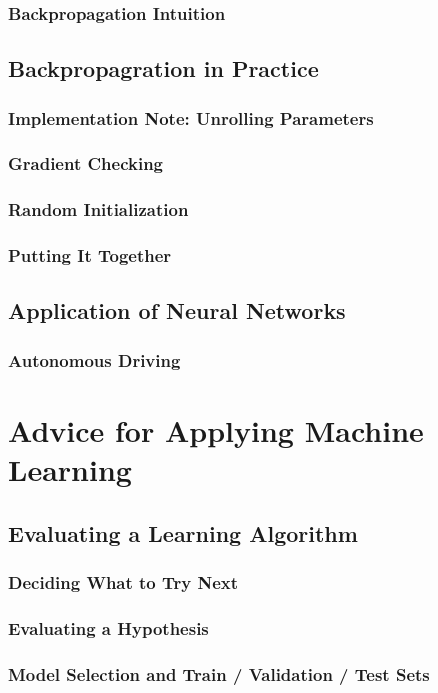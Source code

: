 \documentclass{article}
\begin{document}
\subsubsection{Backpropagation Intuition}
\subsection{Backpropagration in Practice}
\subsubsection{Implementation Note: Unrolling Parameters}
\subsubsection{Gradient Checking}
\subsubsection{Random Initialization}
\subsubsection{Putting It Together}
\subsection{Application of Neural Networks}
\subsubsection{Autonomous Driving}

\newpage

\section{Advice for Applying Machine Learning}
\subsection{Evaluating a Learning Algorithm}
\subsubsection{Deciding What to Try Next}
\subsubsection{Evaluating a Hypothesis}
\subsubsection{Model Selection and Train / Validation / Test Sets}
\end{document}
